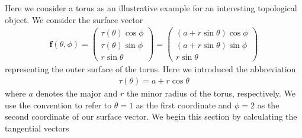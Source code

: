 \documentclass[11pt, DINA4, fleqn]{amsart}
\def\vf{\boldsymbol{f}\xspace}
\begin{document}
Here we consider a torus as an illustrative example for an interesting topological object.
We consider the surface vector
\begin{align}
\vf (\theta, \phi) = 
\begin{pmatrix}
\tau (\theta)\cos\phi \\
\tau (\theta)\sin\phi \\
r\sin\theta
\end{pmatrix}
=
\begin{pmatrix}
(a + r\sin\theta) \cos\phi \\
(a + r\sin\theta) \sin\phi \\
r\sin\theta
\end{pmatrix}
\end{align}
representing the outer surface of the torus. Here we introduced the abbreviation
\begin{align}
\tau (\theta) = a + r \cos\theta
\end{align}
where $a$ denotes the major and $r$ the minor radius of the torus, respectively.
We use the convention to refer to $\theta = 1$ as the first coordinate and $\phi = 2$ as the second coordinate of our surface vector. We begin this section by calculating the tangential vectors
\end{document}
